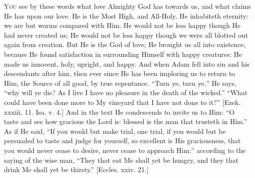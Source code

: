Y\textsc{ou} see by these words what love Almighty God has
towards us, and what claims He has upon our love. He is
the Most High, and All-Holy. He inhabiteth eternity: we
are but worms compared with Him. He would not be less
happy though He had never created us; He would not be
less happy though we were all blotted out again from
creation. But He is the God of love; He brought us all
into existence, because He found satisfaction in
surrounding Himself with happy creatures: He made us
innocent, holy, upright, and happy. And when Adam fell
into sin and his descendants after him, then ever since
He has been imploring us to return to Him, the Source of
all good, by true repentance. ``Turn ye, turn
ye,'' He says, ``why will ye die? As I live I
have no pleasure in the death of the wicked.''
``What could have been done more to My vineyard that
I have not done to it?'' [Ezek. xxxiii. 11. Isa. v.
4.] And in the text He condescends to invite us to Him:
``O taste and see how gracious the Lord is: blessed
is the man that trusteth in Him.'' As if He said,
``If you would but make trial, one trial, if you
would but be persuaded to taste and judge for yourself,
so excellent is His graciousness, that you would never
cease to desire, never cease to approach Him:''
according to the saying of the wise man, ``They that
eat Me shall yet be hungry, and they that drink Me shall
yet be thirsty.'' [Eccles. xxiv. 21.]

